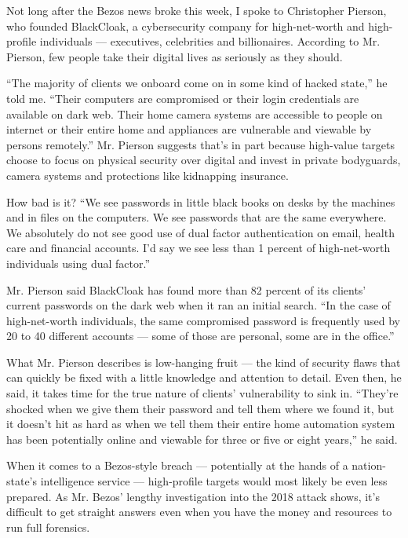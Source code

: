 Not long after the Bezos news broke this week, I spoke to Christopher
Pierson, who founded BlackCloak, a cybersecurity company for
high-net-worth and high-profile individuals --- executives, celebrities
and billionaires. According to Mr. Pierson, few people take their
digital lives as seriously as they should.

``The majority of clients we onboard come on in some kind of hacked
state,'' he told me. ``Their computers are compromised or their login
credentials are available on dark web. Their home camera systems are
accessible to people on internet or their entire home and appliances are
vulnerable and viewable by persons remotely.'' Mr. Pierson suggests
that's in part because high-value targets choose to focus on physical
security over digital and invest in private bodyguards, camera systems
and protections like kidnapping insurance.

How bad is it? ``We see passwords in little black books on desks by the
machines and in files on the computers. We see passwords that are the
same everywhere. We absolutely do not see good use of dual factor
authentication on email, health care and financial accounts. I'd say we
see less than 1 percent of high-net-worth individuals using dual
factor.''

Mr. Pierson said BlackCloak has found more than 82 percent of its
clients' current passwords on the dark web when it ran an initial
search. ``In the case of high-net-worth individuals, the same
compromised password is frequently used by 20 to 40 different accounts
--- some of those are personal, some are in the office.''

What Mr. Pierson describes is low-hanging fruit --- the kind of security
flaws that can quickly be fixed with a little knowledge and attention to
detail. Even then, he said, it takes time for the true nature of
clients' vulnerability to sink in. ``They're shocked when we give them
their password and tell them where we found it, but it doesn't hit as
hard as when we tell them their entire home automation system has been
potentially online and viewable for three or five or eight years,'' he
said.

When it comes to a Bezos-style breach --- potentially at the hands of a
nation-state's intelligence service --- high-profile targets would most
likely be even less prepared. As Mr. Bezos' lengthy investigation into
the 2018 attack shows, it's difficult to get straight answers even when
you have the money and resources to run full forensics.


